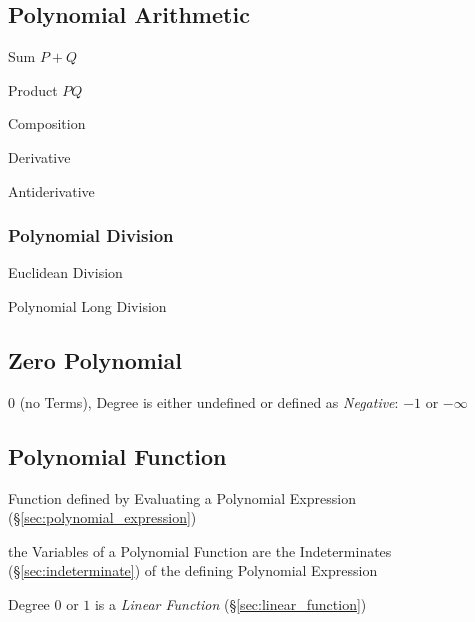 \subsection{Polynomial Arithmetic}\label{sec:polynomial_arithmetic}

Sum $P + Q$

Product $P Q$

Composition

Derivative

Antiderivative



\subsubsection{Polynomial Division}\label{sec:polynomial_division}

Euclidean Division

Polynomial Long Division



\subsection{Zero Polynomial}\label{sec:zero_polynomial}

$0$ (no Terms), Degree is either undefined or defined as \emph{Negative}: $-1$
or $-\infty$



\subsection{Polynomial Function}\label{sec:polynomial_function}

Function defined by Evaluating a Polynomial Expression
(\S\ref{sec:polynomial_expression})

the Variables of a Polynomial Function are the Indeterminates
(\S\ref{sec:indeterminate}) of the defining Polynomial Expression

Degree $0$ or $1$ is a \emph{Linear Function} (\S\ref{sec:linear_function})

